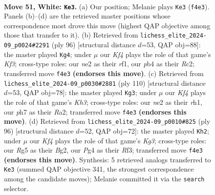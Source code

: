 \documentclass[11pt]{article}
\begin{document}
\clearpage

\begin{figure}[p]\centering
\begin{subfigure}{0.46\textwidth}\centering
\resizebox{\linewidth}{!}{%
\newchessgame
\chessboard[
  setfen={8/7p/3r1p1k/6R1/1p2PKP1/7b/4n1r1/8 w - - 5 51},
  showmover=false,
  pgfstyle=straightmove, color=movearrow, markmove={f4-e3}
]}
\caption{}
\end{subfigure}\hfill
\begin{subfigure}{0.46\textwidth}\centering
\resizebox{\linewidth}{!}{%
\newchessgame
\chessboard[
  setfen={8/5p2/p4r2/1k6/1Pp1RP1P/5K2/1PR5/5r2 w - - 11 49},
  showmover=false,
  pgfstyle=straightmove, color=movearrow, markmove={f3-g4}
]}
\caption{}
\end{subfigure}
\\[4pt]
\begin{subfigure}{0.46\textwidth}\centering
\resizebox{\linewidth}{!}{%
\newchessgame
\chessboard[
  setfen={8/r7/8/pk5p/R5PP/5P1K/R7/7r w - - 1 56},
  showmover=false,
  pgfstyle=straightmove, color=movearrow, markmove={h3-g3}
]}
\caption{}
\end{subfigure}\hfill
\begin{subfigure}{0.46\textwidth}\centering
\resizebox{\linewidth}{!}{%
\newchessgame
\chessboard[
  setfen={8/5p2/5Pk1/3P2p1/4n1P1/4rRK1/6B1/8 w - - 12 49},
  showmover=false,
  pgfstyle=straightmove, color=movearrow, markmove={g3-h2}
]}
\caption{}
\end{subfigure}
\caption{\textbf{Move 51, White: \texttt{Ke3}.} (a) Our position; Melanie plays \texttt{Ke3} (\texttt{f4e3}). Panels (b)--(d) are the retrieved master positions whose correspondence most drove this move (highest QAP objective among those that transfer to it). (b) Retrieved from \texttt{lichess\_elite\_2024-09\_p0024\#2291} (ply 96) [structural distance $d$=53, QAP obj=88]: the master played \texttt{Kg4}; under $\mu$ our \emph{Kf4} plays the role of that game's \emph{Kf3}; cross-type roles: our \emph{n}e2 as their \emph{r}f1, our \emph{p}b4 as their \emph{R}c2; transferred move \texttt{f4e3} \textbf{(endorses this move)}. (c) Retrieved from \texttt{lichess\_elite\_2024-09\_p0030\#2881} (ply 110) [structural distance $d$=53, QAP obj=78]: the master played \texttt{Kg3}; under $\mu$ our \emph{Kf4} plays the role of that game's \emph{Kh3}; cross-type roles: our \emph{n}e2 as their \emph{r}h1, our \emph{p}h7 as their \emph{R}a2; transferred move \texttt{f4e3} \textbf{(endorses this move)}. (d) Retrieved from \texttt{lichess\_elite\_2024-09\_p0010\#825} (ply 96) [structural distance $d$=52, QAP obj=72]: the master played \texttt{Kh2}; under $\mu$ our \emph{Kf4} plays the role of that game's \emph{Kg3}; cross-type roles: our \emph{R}g5 as their \emph{B}g2, our \emph{P}g4 as their \emph{R}f3; transferred move \texttt{f4e3} \textbf{(endorses this move)}. Synthesis: 5 retrieved analogs transferred to \texttt{Ke3} (summed QAP objective 341, the strongest correspondence among the candidate moves); Melanie committed it via the \texttt{search} selector.}
\label{fig:thought-m100}
\end{figure}
\end{document}
